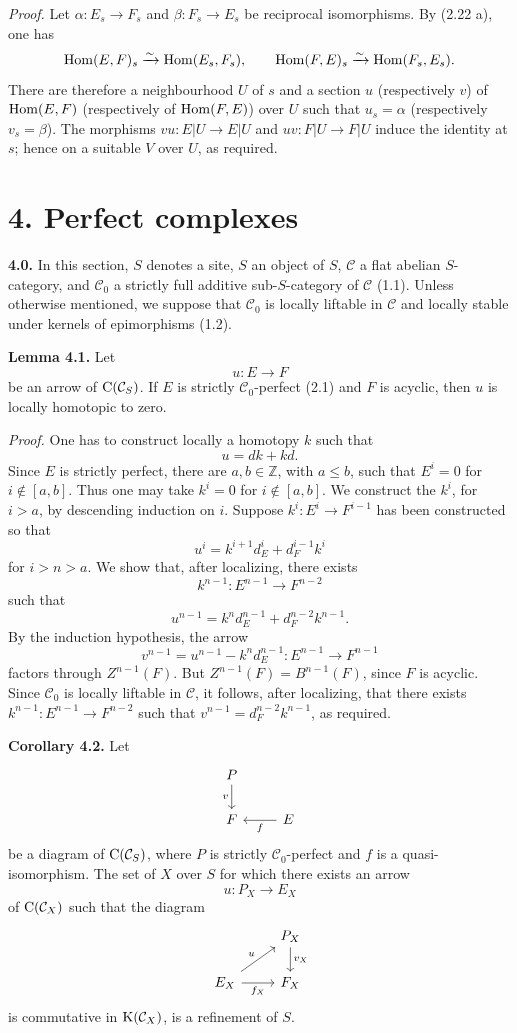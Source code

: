 \documentclass[11pt]{article}
\begin{document}
\emph{Proof.} Let \(\alpha:E_s\to F_s\) and \(\beta:F_s\to E_s\) be reciprocal isomorphisms. By (2.22 a), one has
\[
  \operatorname{Hom}(E,F)_s\xrightarrow{\sim}\operatorname{Hom}(E_s,F_s),
  \qquad
  \operatorname{Hom}(F,E)_s\xrightarrow{\sim}\operatorname{Hom}(F_s,E_s).
\]
There are therefore a neighbourhood \(U\) of \(s\) and a section \(u\) (respectively \(v\)) of \(\operatorname{Hom}(E,F)\) (respectively of \(\operatorname{Hom}(F,E)\)) over \(U\) such that \(u_s=\alpha\) (respectively \(v_s=\beta\)). The morphisms \(vu:E|U\to E|U\) and \(uv:F|U\to F|U\) induce the identity at \(s\); hence on a suitable \(V\) over \(U\), as required.

\section*{4. Perfect complexes}

\textbf{4.0.} In this section, \(S\) denotes a site, \(S\) an object of \(S\), \(\mathcal C\) a flat abelian \(S\)-category, and \(\mathcal C_0\) a strictly full additive sub-\(S\)-category of \(\mathcal C\) (1.1). Unless otherwise mentioned, we suppose that \(\mathcal C_0\) is locally liftable in \(\mathcal C\) and locally stable under kernels of epimorphisms (1.2).

\textbf{Lemma 4.1.} Let
\[
  u:E\longrightarrow F
\]
be an arrow of \(\mathrm C(\mathcal C_S)\). If \(E\) is strictly \(\mathcal C_0\)-perfect (2.1) and \(F\) is acyclic, then \(u\) is locally homotopic to zero.

\emph{Proof.} One has to construct locally a homotopy \(k\) such that
\[
  u=dk+kd.
\]
Since \(E\) is strictly perfect, there are \(a,b\in\mathbb Z\), with \(a\leq b\), such that \(E^i=0\) for \(i\notin[a,b]\). Thus one may take \(k^i=0\) for \(i\notin[a,b]\). We construct the \(k^i\), for \(i>a\), by descending induction on \(i\). Suppose \(k^i:E^i\to F^{i-1}\) has been constructed so that
\[
  u^i=k^{i+1}d_E^i+d_F^{i-1}k^i
\]
for \(i>n>a\). We show that, after localizing, there exists
\[
  k^{n-1}:E^{n-1}\longrightarrow F^{n-2}
\]
such that
\[
  u^{n-1}=k^n d_E^{n-1}+d_F^{n-2}k^{n-1}.
\]
By the induction hypothesis, the arrow
\[
  v^{n-1}=u^{n-1}-k^n d_E^{n-1}:E^{n-1}\longrightarrow F^{n-1}
\]
factors through \(Z^{n-1}(F)\). But \(Z^{n-1}(F)=B^{n-1}(F)\), since \(F\) is acyclic. Since \(\mathcal C_0\) is locally liftable in \(\mathcal C\), it follows, after localizing, that there exists \(k^{n-1}:E^{n-1}\to F^{n-2}\) such that \(v^{n-1}=d_F^{n-2}k^{n-1}\), as required.

\textbf{Corollary 4.2.} Let
\[
\begin{tikzcd}
P \arrow[d,"v"'] \\
F & E \arrow[l,"f"]
\end{tikzcd}
\]
be a diagram of \(\mathrm C(\mathcal C_S)\), where \(P\) is strictly \(\mathcal C_0\)-perfect and \(f\) is a quasi-isomorphism. The set of \(X\) over \(S\) for which there exists an arrow
\[
  u:P_X\longrightarrow E_X
\]
of \(\mathrm C(\mathcal C_X)\) such that the diagram
\[
\begin{tikzcd}
& P_X \arrow[d,"v_X"]\\
E_X \arrow[r,"f_X"'] \arrow[ur,"u"] & F_X
\end{tikzcd}
\]
is commutative in \(\mathrm K(\mathcal C_X)\), is a refinement of \(S\).
\end{document}
